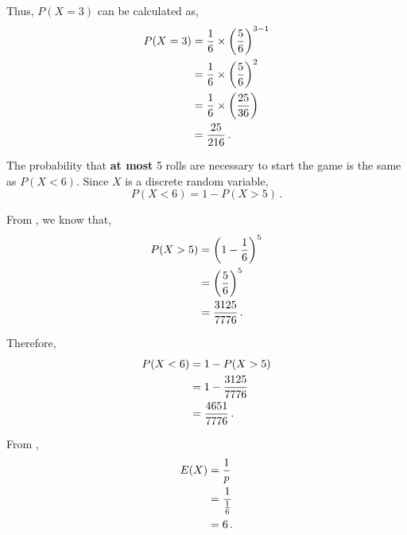 \begin{subquestions}
\begin{subsubquestions}
Thus, $P(X=3)$ can be calculated as,
\begin{align}
	P(X = 3) & = \frac{1}{6} \times \left(\frac{5}{6} \right)^{3-1} \nonumber \\
	         & = \frac{1}{6} \times \left(\frac{5}{6} \right)^{2} \nonumber \\
	         & = \frac{1}{6} \times \left(\frac{25}{36} \right) \nonumber \\
	         & = \frac{25}{216} \,.
\end{align}


\subsubquestion

The probability that \textbf{at most} 5 rolls are necessary to start the game is the same as $P(X<6)$. Since $X$ is a discrete random variable,
\begin{equation}
	P(X<6) = 1 - P(X>5) \,.
\end{equation}

From , we know that,
\begin{align}
	P(X>5) & = \left(1 - \frac{1}{6} \right)^5 \nonumber \\
	       & = \left(\frac{5}{6} \right)^5 \nonumber \\
	       & = \frac{3125}{7776} \,.
\end{align}

Therefore,
\begin{align}
	P(X<6) & = 1 - P(X>5) \nonumber \\
	       & = 1 - \frac{3125}{7776} \nonumber \\
	       & = \frac{4651}{7776} \,.
\end{align}


\subsubquestion

From ,
\begin{align}
	E(X) & = \frac{1}{p} \nonumber \\
	     & = \frac{1}{\frac{1}{6}} \nonumber \\
	     & = 6 \,.
\end{align}

\end{subsubquestions}



\end{subquestions}
